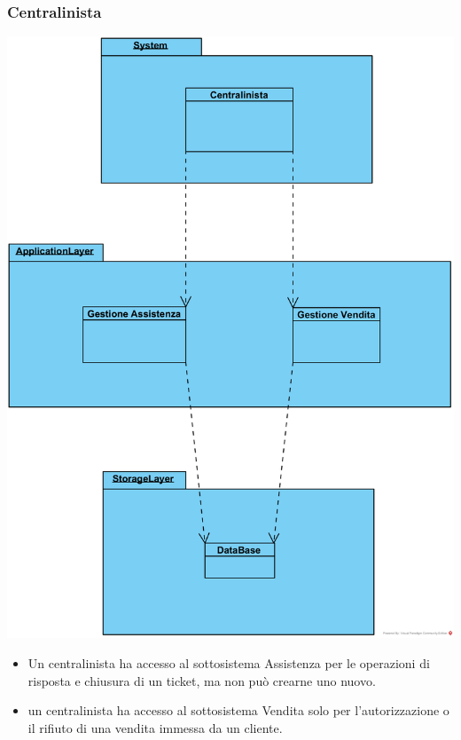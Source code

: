 \documentclass[12pt,a4paper]{article}
\begin{document}
\subsubsection{Centralinista}
\begin{center}
\includegraphics[height=0.34\textheight]{Centralinista}
\end{center}

\begin{itemize}
\item Un centralinista ha accesso al sottosistema Assistenza per le operazioni di risposta e chiusura di un ticket, ma non può crearne uno nuovo.
\item un centralinista ha accesso al sottosistema Vendita solo per l'autorizzazione o il rifiuto di una vendita immessa da un cliente.
\end{itemize}
\end{document}
